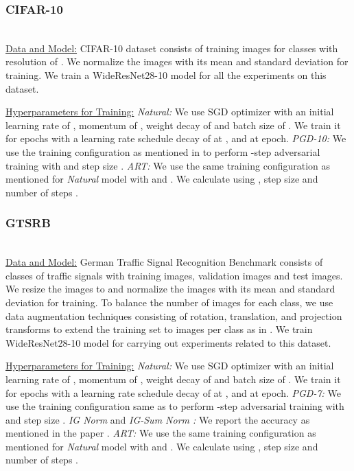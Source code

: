 \documentclass[runningheads]{llncs}
\begin{document}
\subsubsection{CIFAR-10} \hspace*{\fill} \\
\underline{Data and Model:} CIFAR-10 dataset \cite{krizhevsky2010cifar} consists of  training images for  classes with resolution of . We normalize the images with its mean and standard deviation for training. We train a WideResNet28-10 \cite{wrn} model for all the experiments on this dataset.
\vspace{3pt}


\noindent \underline{Hyperparameters for Training:} \newline
\textit{Natural:} We use SGD optimizer with an initial learning rate of , momentum of ,   weight decay of  and batch size of . We train it for  epochs with a learning rate schedule decay of  at ,  and  at  epoch.
\newline
\textit{PGD-10:} We use the training configuration as mentioned in \cite{model_cifar} to perform -step adversarial training with  and step size .
\newline
\textit{ART:} We use the same training configuration as mentioned for \textit{Natural} model with  and . We calculate  using , step size  and number of steps . 

\subsubsection{GTSRB} \hspace*{\fill} \\ 
\underline{Data and Model:} German Traffic Signal Recognition Benchmark \cite{gtsrb} consists of  classes of traffic signals with  training images,  validation images and  test images. We resize the images to  and normalize the images with its mean and standard deviation for training. To balance the number of images for each class, we use data augmentation techniques consisting of rotation, translation, and projection transforms to extend the training set to  images per class as in \cite{robust_attr_nips_sal}. We train WideResNet28-10 \cite{wrn} model for carrying out experiments related to this dataset.
\vspace{3pt}

\noindent \underline{Hyperparameters for Training:} \newline
\textit{Natural:} We use SGD optimizer with an initial learning rate of , momentum of ,   weight decay of  and batch size of . We train it for  epochs with a learning rate schedule decay of  at ,  and  at  epoch.
\newline
\textit{PGD-7:} We use the training configuration same as \cite{robust_attr_nips_sal} to perform -step adversarial training with  and step size .
\newline
\textit{IG Norm} and \textit{IG-Sum Norm \cite{robust_attr_nips_sal}: } We report the accuracy as mentioned in the paper \cite{robust_attr_nips_sal}.
\newline
\textit{ART:} We use the same training configuration as mentioned for \textit{Natural} model with  and . We calculate  using , step size  and number of steps . 
\end{document}
